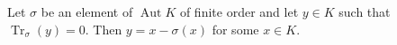 Let $\sigma$ be an element of $\operatorname{Aut} K$ of finite order and let $y \in K$ such that $\operatorname{Tr}_\sigma(y) = 0$. Then $y = x - \sigma(x)$ for some $x \in K$.
